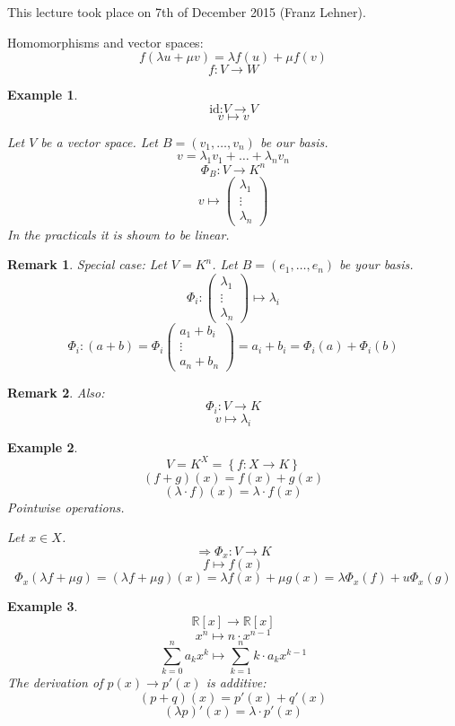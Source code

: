 \documentclass[a4paper,landscape,twocolumn]{article}
\newcommand\meta[3]{This #1 took place on #2 (#3).\par}
\newcommand\set[1]{\left\{#1\right\}}
\newtheorem{ex}{Example}
\newtheorem{rem}{Remark}
\begin{document}
\meta{lecture}{7th of December 2015}{Franz Lehner}

Homomorphisms and vector spaces:
\[ f(\lambda u + \mu v) = \lambda f(u) + \mu f(v) \]
\[ f: V \rightarrow W \]

\begin{ex}
  \[ \text{id:} V \rightarrow V \]
  \[ v \mapsto v \]

  Let $V$ be a vector space.
  Let $B = (v_1, \dots, v_n)$ be our basis.
  \[ v = \lambda_1 v_1 + \dots + \lambda_n v_n \]
  \[ \Phi_B: V \rightarrow K^n \]
  \[ v \mapsto \begin{pmatrix} \lambda_1 \\ \vdots \\ \lambda_n \end{pmatrix} \]
  In the practicals it is shown to be linear.
\end{ex}

\begin{rem}
  Special case: Let $V = K^n$. Let $B = (e_1, \dots, e_n)$ be your basis.
  \[ \Phi_i: \begin{pmatrix} \lambda_1 \\ \vdots \\ \lambda_n \end{pmatrix} \mapsto \lambda_i \]
  \[ \Phi_i: (a + b) = \Phi_i \begin{pmatrix} a_1 + b_i \\ \vdots \\ a_n + b_n \end{pmatrix} = a_i + b_i = \Phi_i(a) + \Phi_i(b) \]
\end{rem}

\begin{rem}
  Also:
  \[ \Phi_i: V \rightarrow K \]
  \[ v \mapsto \lambda_i \]
\end{rem}

\begin{ex}
  \[ V = K^X = \set{f: X \rightarrow K} \]
  \[ (f+g)(x) = f(x) + g(x) \]
  \[ (\lambda \cdot f)(x) = \lambda \cdot f(x) \]
  Pointwise operations.

  Let $x \in X$.
  \[ \Rightarrow \Phi_x: V \rightarrow K \]
  \[ f \mapsto f(x) \]
  \[ \Phi_x(\lambda f + \mu g) = (\lambda f + \mu g)(x) = \lambda f(x) + \mu g(x) = \lambda \Phi_x(f) + u \Phi_x(g) \]
\end{ex}

\begin{ex}
  \[ \mathbb R[x] \rightarrow \mathbb R[x] \]
  \[ x^n \mapsto n \cdot x^{n-1} \]
  \[ \sum_{k=0}^n a_k x^k \mapsto \sum_{k=1}^n k \cdot a_k x^{k-1} \]
  The derivation of $p(x) \rightarrow p'(x)$ is additive:
  \[ (p + q)(x) = p'(x) + q'(x) \]
  \[ (\lambda p)' (x) = \lambda \cdot p'(x) \]
\end{ex}
\end{document}
